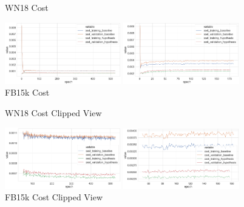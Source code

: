
\begin{figure}[H]
	\parbox{.5\linewidth}{
   		\caption{WN18 Cost}
   		\centering
    		\includegraphics[width=0.45\textwidth, height=0.2\textheight]{WN18_Cost_Results}
		}
	\hfill
	\parbox{.5\linewidth}{
		\caption{FB15k Cost}
   		\centering
		\includegraphics[width=0.45\textwidth, height=0.2\textheight]{FB15k_Cost_Results}
		}
\end{figure}

\begin{figure}[H]
	\parbox{.5\linewidth}{
   		\caption{WN18 Cost Clipped View}
   		\centering
    		\includegraphics[width=0.45\textwidth, height=0.2\textheight]{WN18_Cost_Results_Clipped}
		}
	\hfill
	\parbox{.5\linewidth}{
		\caption{FB15k Cost Clipped View}
   		\centering
		\includegraphics[width=0.45\textwidth, height=0.2\textheight]{FB15k_Cost_Results_Clipped}
		}
\end{figure}


